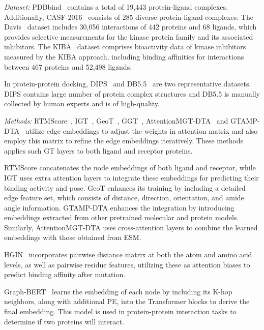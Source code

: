 \textit{Dataset:} PDBbind~\cite{wang2004pdbbind} contains a total of 19,443 protein-ligand complexes. Additionally, CASF-2016~\cite{su2018comparative} consists of 285 diverse protein-ligand complexes. The Davis~\cite{davis2011comprehensive} dataset includes 30,056 interactions of 442 proteins and 68 ligands, which provides selective measurements for the kinase protein family and its associated inhibitors. The KIBA~\cite{tang2014making} dataset comprises bioactivity data of kinase inhibitors measured by the KIBA approach, including binding affinities for interactions between 467 proteins and 52,498 ligands.

In protein-protein docking, DIPS~\cite{townshend2019end} and DB5.5~\cite{vreven2015updates} are two representative datasets. DIPS contains large number of protein complex structures and DB5.5 is manually collected by human experts and is of high-quality.

\textit{Methods:} 
RTMScore~\cite{shen2022boosting}, IGT~\cite{liu2022improved},  GeoT~\cite{morehead2022geometric}, GGT~\cite{chen2023gated}, AttentionMGT-DTA~\cite{wu2024attentionmgt} and GTAMP-DTA~\cite{tian2024gtamp} utilize edge embeddings to adjust the weights in attention matrix and also employ this matrix to refine the edge embeddings iteratively. These methods applies such GT layers to both ligand and receptor proteins. 

RTMScore concatenates the node embeddings of both ligand and receptor, while IGT uses extra attention layers to integrate these embeddings for predicting their binding activity and pose. GeoT enhances its training by including a detailed edge feature set, which consists of distance, direction, orientation, and amide angle information. GTAMP-DTA enhances the integration by introducing embeddings extracted from other pretrained molecular and protein models. Similarly, AttentionMGT-DTA uses cross-attention layers to combine the learned embeddings with those obtained from ESM.

HGIN~\cite{zhao2023geometric} incorporates pairwise distance matrix at both the atom and amino acid levels, as well as pairwise residue features, utilizing these as attention biases to predict binding affinity after mutation.

Graph-BERT~\cite{jha2023graph} learns the  embedding of each node by including its K-hop neighbors, along with additional PE, into the Transformer blocks to derive the final embedding. This model is used in protein-protein interaction tasks to determine if two proteins will interact.

